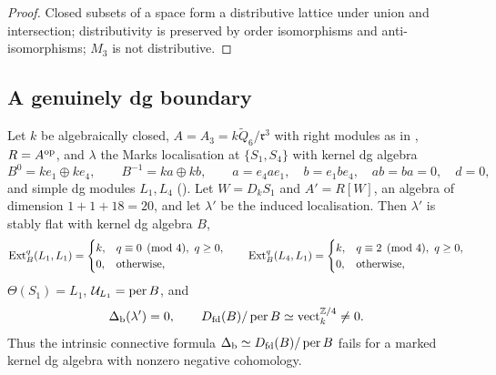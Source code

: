 \begin{proof}
Closed subsets of a space form a distributive lattice under union and intersection; distributivity is preserved by order isomorphisms and anti-isomorphisms; \(M_3\) is not distributive.
\end{proof}

\subsection{A genuinely dg boundary}

\begin{theorem}\label{thm:dg-boundary}
Let \(k\) be algebraically closed, \(A=A_3=k\widetilde Q_6/\mathfrak r^3\) with right modules as in , \(R=A^{\mathrm{op}}\), and \(\lambda\) the Marks localisation at \(\{S_1,S_4\}\) with kernel dg algebra
\[
 B^0=ke_1\oplus ke_4,\qquad B^{-1}=ka\oplus kb,\qquad a=e_4ae_1,\quad b=e_1be_4,\quad ab=ba=0,\quad d=0,
\]
and simple dg modules \(L_1,L_4\) \textup{()}.  Let \(W=D_kS_1\) and \(A'=R[W]\), an algebra of dimension \(1+1+18=20\), and let \(\lambda'\) be the induced localisation.  Then \(\lambda'\) is stably flat with kernel dg algebra \(B\),
\begin{equation}\label{eq:ext-degrees}
 \Ext^q_B(L_1,L_1)=\begin{cases}k,&q\equiv0\pmod4,\ q\ge0,\\0,&\text{otherwise},\end{cases}
 \qquad
 \Ext^q_B(L_4,L_1)=\begin{cases}k,&q\equiv2\pmod4,\ q\ge0,\\0,&\text{otherwise},\end{cases}
\end{equation}
\(\Theta(S_1)=L_1\), \(\mathcal U_{L_1}=\operatorname{per} B\), and
\begin{equation}\label{eq:dg-boundary}
 \Delta_{\mathrm b}(\lambda')=0,\qquad D_{\mathrm{fd}}(B)/\operatorname{per} B\simeq\operatorname{vect}_k^{\mathbb Z/4}\ne0 .
\end{equation}
Thus the intrinsic connective formula \(\Delta_{\mathrm b}\simeq D_{\mathrm{fd}}(B)/\operatorname{per} B\) fails for a marked kernel dg algebra with nonzero negative cohomology.
\end{theorem}

